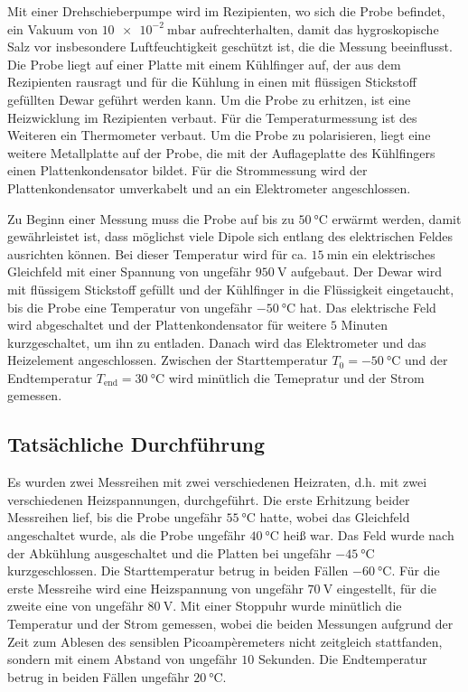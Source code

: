 Mit einer Drehschieberpumpe wird im Rezipienten, wo sich die Probe befindet, ein Vakuum von $\qty{10e-2}{\milli\bar}$ aufrechterhalten, damit das hygroskopische Salz vor insbesondere Luftfeuchtigkeit 
geschützt ist, die die Messung beeinflusst. Die Probe liegt auf einer Platte mit einem Kühlfinger auf, der aus dem Rezipienten rausragt und für die Kühlung in einen mit flüssigen Stickstoff gefüllten Dewar geführt werden kann.
Um die Probe zu erhitzen, ist eine Heizwicklung im Rezipienten verbaut. Für die Temperaturmessung ist des Weiteren ein Thermometer verbaut.
Um die Probe zu polarisieren, liegt eine weitere Metallplatte auf der Probe, die mit der Auflageplatte des Kühlfingers einen Plattenkondensator bildet. Für die Strommessung wird der Plattenkondensator
umverkabelt und an ein Elektrometer angeschlossen.

Zu Beginn einer Messung muss die Probe auf bis zu $\qty{50}{\celsius}$ erwärmt werden, damit gewährleistet ist, dass möglichst viele Dipole sich entlang des elektrischen Feldes ausrichten können.
Bei dieser Temperatur wird für ca. $\qty{15}{\minute}$ ein elektrisches Gleichfeld mit einer Spannung von ungefähr $\qty{950}{\volt}$ aufgebaut. Der Dewar wird mit flüssigem Stickstoff gefüllt und der Kühlfinger
in die Flüssigkeit eingetaucht, bis die Probe eine Temperatur von ungefähr $\qty{-50}{\celsius}$ hat. Das elektrische Feld wird abgeschaltet und der Plattenkondensator für weitere $5$ Minuten kurzgeschaltet,
um ihn zu entladen. Danach wird das Elektrometer und das Heizelement angeschlossen. Zwischen der Starttemperatur $T_0 = \qty{-50}{\celsius}$ und der Endtemperatur $T_\text{end} = \qty{30}{\celsius}$ wird minütlich die Temepratur und der Strom gemessen.

\subsection{Tatsächliche Durchführung}

Es wurden zwei Messreihen mit zwei verschiedenen Heizraten, d.h. mit zwei verschiedenen Heizspannungen, durchgeführt. Die erste Erhitzung beider Messreihen lief, bis die Probe ungefähr $\qty{55}{\celsius}$ hatte, wobei das Gleichfeld angeschaltet wurde, als die Probe ungefähr $\qty{40}{\celsius}$ heiß war.
Das Feld wurde nach der Abkühlung ausgeschaltet und die Platten bei ungefähr $\qty{-45}{\celsius}$ kurzgeschlossen. Die Starttemperatur betrug in beiden Fällen $\qty{-60}{\celsius}$. Für die erste Messreihe wird eine Heizspannung von ungefähr $\qty{70}{\volt}$ eingestellt, für die zweite eine von ungefähr $\qty{80}{\volt}$. 
Mit einer Stoppuhr wurde minütlich die Temperatur und der Strom gemessen, wobei die beiden Messungen aufgrund der Zeit zum Ablesen
des sensiblen Picoampèremeters nicht zeitgleich stattfanden, sondern mit einem Abstand von ungefähr $10$ Sekunden. Die Endtemperatur betrug in beiden Fällen ungefähr $\qty{20}{\celsius}$.